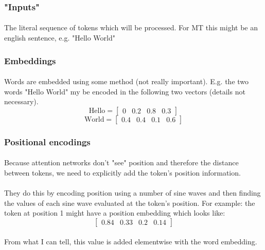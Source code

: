 \documentclass{article}
\begin{document}
    \subsubsection{"Inputs"}
    \paragraph{} The literal sequence of tokens which will be processed. For MT this might be an english sentence, e.g. "Hello World"

    \subsubsection{Embeddings}
    \paragraph{} Words are embedded using some method (not really important). E.g. the two words "Hello World" my be encoded in the following two vectors (details not necessary).
    \[ \text{Hello} = \begin{bmatrix}
        0 & 0.2 & 0.8 & 0.3
    \end{bmatrix} \]
    \[ \text{World} = \begin{bmatrix}
        0.4 & 0.4 & 0.1 & 0.6
    \end{bmatrix} \]

    \subsubsection{Positional encodings}
    \paragraph{} Because attention networks don't "see" position and therefore the distance between tokens, we need to explicitly add the token's position information.
    \paragraph{} They do this by encoding position using a number of sine waves and then finding the values of each sine wave evaluated at the token's position.
    For example: the token at position 1 might have a position embedding which looks like:
    \[ \begin{bmatrix}
        0.84 & 0.33 & 0.2 & 0.14
    \end{bmatrix} \]

    \paragraph{} From what I can tell, this value is added elementwise with the word embedding.
\end{document}
